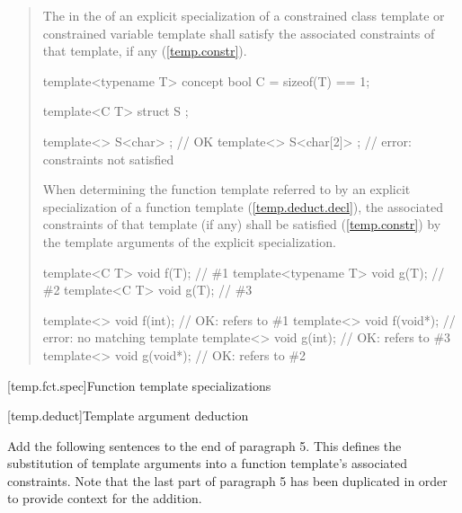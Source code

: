 \begin{quote}
\setcounter{Paras}{11}
\pnum
The  in the
 of an explicit 
specialization of a constrained class template or
constrained variable template shall satisfy the associated constraints
of that template, if any (\ref{temp.constr}).
% 
\enterexample
\begin{codeblock}
template<typename T> concept bool C = sizeof(T) == 1;

template<C T> struct S { };

template<> S<char> { };    // OK
template<> S<char[2]> { }; // error: constraints not satisfied
\end{codeblock}
\exitexample

\pnum
When determining the function template referred to by an explicit 
specialization of a function template 
(\ref{temp.deduct.decl}),
the associated constraints of that template (if any) shall be satisfied 
(\ref{temp.constr}) by the
template arguments of the explicit specialization.
% 
\enterexample
\begin{codeblock}
template<C T>        void f(T); // \#1
template<typename T> void g(T); // \#2
template<C T>        void g(T); // \#3

template<> void f(int);   // OK: refers to \#1
template<> void f(void*); // error: no matching template
template<> void g(int);   // OK: refers to \#3
template<> void g(void*); // OK: refers to \#2
\end{codeblock}
\exitexample
\end{quote}


%
%
[temp.fct.spec]{Function template specializations}

[temp.deduct]{Template argument deduction}

Add the following sentences to the end of paragraph 5. This defines
the substitution of template arguments into a function template's
associated constraints. Note that the last part of paragraph 5
has been duplicated in order to provide context for the addition.

